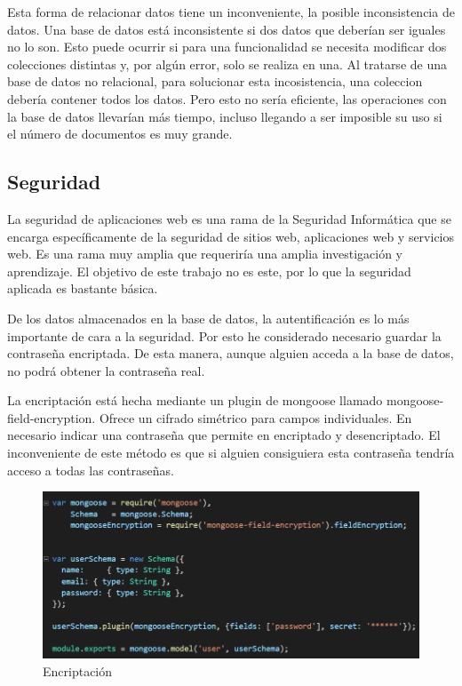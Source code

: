 \documentclass[a4paper, 12pt]{book}
\begin{document}
Esta forma de relacionar datos tiene un inconveniente, la posible inconsistencia de datos. Una base de datos est\'a inconsistente si dos datos que deber\'ian ser iguales no lo son. Esto puede ocurrir si para una funcionalidad se necesita modificar dos colecciones distintas y, por alg\'un error, solo se realiza en una. Al tratarse de una base de datos no relacional, para solucionar esta incosistencia, una coleccion deber\'ia contener todos los datos. Pero esto no ser\'ia eficiente, las operaciones con la base de datos llevar\'ian m\'as tiempo, incluso llegando a ser imposible su uso si el n\'umero de documentos es muy grande.




\subsection{Seguridad} 
\label{sec:seguridad}

La seguridad de aplicaciones web es una rama de la Seguridad Inform\'atica que se encarga espec\'ificamente de la seguridad de sitios web, aplicaciones web y servicios web. Es una rama muy amplia que requerir\'ia una amplia investigaci\'on y aprendizaje. El objetivo de este trabajo no es este, por lo que la seguridad aplicada es bastante b\'asica.

De los datos almacenados en la base de datos, la autentificaci\'on es lo m\'as importante de cara a la seguridad. Por esto he considerado necesario guardar la contrase\~na encriptada. De esta manera, aunque alguien acceda a la base de datos, no podr\'a obtener la contrase\~na real.

La encriptaci\'on est\'a hecha mediante un plugin de mongoose llamado mongoose-field-encryption. Ofrece un cifrado sim\'etrico para campos individuales. En necesario indicar una contrase\~na que permite en encriptado y desencriptado. El inconveniente de este m\'etodo es que si alguien consiguiera esta contrase\~na tendr\'ia acceso a todas las contrase\~nas.

\begin{figure}[H]
  \centering
  \includegraphics[width=12cm, keepaspectratio]{img/enc.png}
  \caption{Encriptaci\'on}
  \label{f:}
\end{figure}
\end{document}
